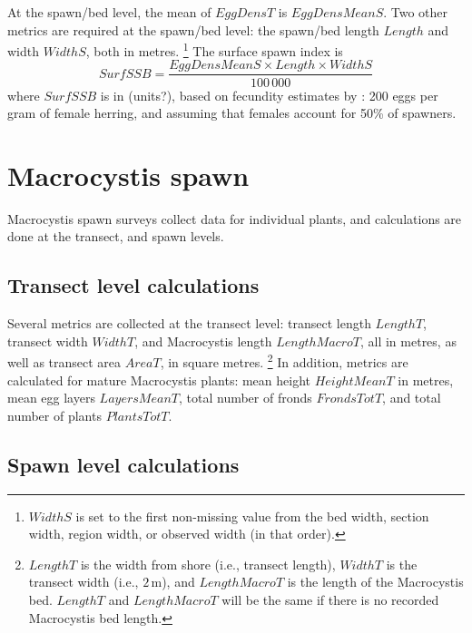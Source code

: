 \documentclass[12pt]{article}
\begin{document}
At the spawn/bed level, the mean of $EggDensT$ is $EggDensMeanS$.
Two other metrics are required at the spawn/bed level: the spawn/bed length $Length$ and width $WidthS$, both in metres.%
\footnote{$WidthS$ is set to the first non-missing value from the bed width, section width, region width, or observed width (in that order).}
The surface spawn index is
\begin{equation}
SurfSSB = \frac{EggDensMeanS \times Length \times WidthS} {100\,000}
\label{eqBiomassSurf}
\end{equation}
where $SurfSSB$ is in (units?), based on fecundity estimates by \citet{Hay1985}: 200 eggs per gram of female herring, and assuming that females account for 50\% of spawners.

\section{Macrocystis spawn}

Macrocystis spawn surveys collect data for individual plants, and calculations are done at the transect, and spawn levels.

\subsection{Transect level calculations}

Several metrics are collected at the transect level: transect length $LengthT$, transect width $WidthT$, and Macrocystis length $LengthMacroT$, all in metres, as well as transect area $AreaT$, in square metres.%
\footnote{$LengthT$ is the width from shore (i.e., transect length), $WidthT$ is the transect width (i.e., $2\,\text{m}$), and $LengthMacroT$ is the length of the Macrocystis bed.
$LengthT$ and $LengthMacroT$ will be the same if there is no recorded Macrocystis bed length.}
In addition, metrics are calculated for mature Macrocystis plants: mean height $HeightMeanT$ in metres, mean egg layers $LayersMeanT$, total number of fronds $FrondsTotT$, and total number of plants $PlantsTotT$.

\subsection{Spawn level calculations}
\end{document}
